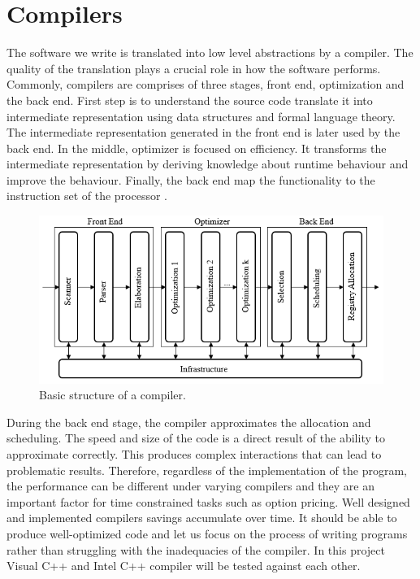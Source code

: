 \documentclass[12pt, oneside]{book}
\theoremstyle{plain}
\theoremstyle{definition}
\begin{document}
\section{Compilers}
The software we write is translated into low level abstractions by a compiler. The quality of the translation plays a crucial role in how the software performs. Commonly, compilers are comprises of three stages, front end, optimization and the back end.  First step is to understand the source code translate it into intermediate representation using data structures and formal language theory. The intermediate representation generated in the front end is later used by the back end. In the middle, optimizer is focused on efficiency. It transforms the intermediate representation by deriving knowledge about runtime behaviour and improve the behaviour. Finally, the back end map the functionality to the instruction set of the processor \cite{compiler}. 

\begin{figure}[!htb]
    \centering
        \includegraphics[scale=1]{compiler.png}
    \caption{Basic structure of a compiler.}
\end{figure}

During the back end stage, the compiler approximates the allocation and scheduling. The speed and size of the code is a direct result of the ability to approximate correctly. This produces complex interactions that can lead to problematic results. Therefore, regardless of the implementation of the program, the performance can be different under varying compilers and they are an important factor for time constrained tasks such as option pricing.  Well designed and implemented compilers savings accumulate over time. It should be able to produce well-optimized code and let us focus on the process of writing programs rather than struggling with the inadequacies of the compiler.  In this project Visual C++ and Intel C++ compiler will be tested against each other. 
\end{document}
